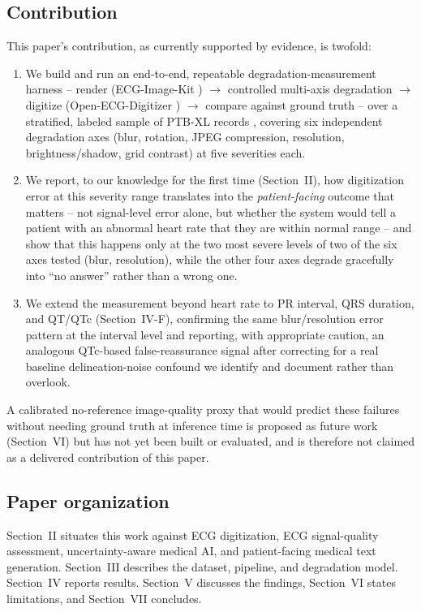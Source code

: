 \documentclass[conference]{IEEEtran}
\begin{document}
\subsection{Contribution}

This paper's contribution, as currently supported by evidence, is twofold:

\begin{enumerate}
\item We build and run an end-to-end, repeatable degradation-measurement harness --
render (ECG-Image-Kit \cite{ref1}) $\to$ controlled multi-axis degradation $\to$
digitize (Open-ECG-Digitizer \cite{ref5}) $\to$ compare against ground truth -- over a
stratified, labeled sample of PTB-XL records \cite{ref45}, covering six independent
degradation axes (blur, rotation, JPEG compression, resolution, brightness/shadow,
grid contrast) at five severities each.
\item We report, to our knowledge for the first time (Section~II), how digitization
error at this severity range translates into the \emph{patient-facing} outcome that
matters -- not signal-level error alone, but whether the system would tell a patient
with an abnormal heart rate that they are within normal range -- and show that this
happens only at the two most severe levels of two of the six axes tested (blur,
resolution), while the other four axes degrade gracefully into ``no answer'' rather
than a wrong one.
\item We extend the measurement beyond heart rate to PR interval, QRS duration, and
QT/QTc (Section~IV-F), confirming the same blur/resolution error pattern at the
interval level and reporting, with appropriate caution, an analogous QTc-based
false-reassurance signal after correcting for a real baseline delineation-noise
confound we identify and document rather than overlook.
\end{enumerate}

A calibrated no-reference image-quality proxy that would predict these failures
without needing ground truth at inference time is proposed as future work
(Section~VI) but has not yet been built or evaluated, and is therefore not claimed as
a delivered contribution of this paper.

\subsection{Paper organization}

Section~II situates this work against ECG digitization, ECG signal-quality
assessment, uncertainty-aware medical AI, and patient-facing medical text generation.
Section~III describes the dataset, pipeline, and degradation model. Section~IV
reports results. Section~V discusses the findings, Section~VI states limitations, and
Section~VII concludes.
\end{document}
